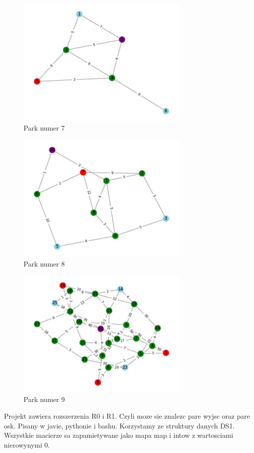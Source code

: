 \documentclass{article}
\begin{document}
\begin{figure}[h!]
\centering
\includegraphics[width=0.75\textwidth]{7.jpg}
\caption{Park numer 7}
\end{figure}
\begin{figure}[h!]
\centering
\includegraphics[width=0.75\textwidth]{8.jpg}
\caption{Park numer 8}
\end{figure}
\begin{figure}[h!]
\centering
\includegraphics[width=0.75\textwidth]{9.jpg}
\caption{Park numer 9}
\end{figure}
Projekt zawiera rozszerzenia R0 i R1. Czyli moze sie znalezc pare wyjsc oraz pare osk. Pisany w javie, pythonie i bashu. Korzystamy ze struktury danych DS1. Wszystkie macierze sa zapamietywane jako mapa map i intow z wartosciami nierowynymi 0. 
\end{document}
